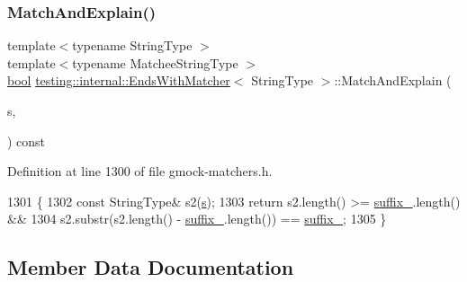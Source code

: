 \subsubsection{\texorpdfstring{Match\+And\+Explain()}{MatchAndExplain()}\hspace{0.1cm}{\footnotesize\ttfamily [2/2]}}
{\footnotesize\ttfamily template$<$typename String\+Type $>$ \\
template$<$typename Matchee\+String\+Type $>$ \\
\hyperlink{classbool}{bool} \hyperlink{classtesting_1_1internal_1_1EndsWithMatcher}{testing\+::internal\+::\+Ends\+With\+Matcher}$<$ String\+Type $>$\+::Match\+And\+Explain (\begin{DoxyParamCaption}\item[{const Matchee\+String\+Type \&}]{s,  }\item[{\hyperlink{classtesting_1_1MatchResultListener}{Match\+Result\+Listener} $\ast$}]{ }\end{DoxyParamCaption}) const\hspace{0.3cm}{\ttfamily [inline]}}



Definition at line 1300 of file gmock-\/matchers.\+h.


\begin{DoxyCode}
1301                                                      \{
1302     \textcolor{keyword}{const} StringType& s2(\hyperlink{namespaceservice__node__3_aa976421a49e0b54f23833423400849ae}{s});
1303     \textcolor{keywordflow}{return} s2.length() >= \hyperlink{classtesting_1_1internal_1_1EndsWithMatcher_a66f75082cf1041cd328c01b47acf8350}{suffix\_}.length() &&
1304         s2.substr(s2.length() - \hyperlink{classtesting_1_1internal_1_1EndsWithMatcher_a66f75082cf1041cd328c01b47acf8350}{suffix\_}.length()) == \hyperlink{classtesting_1_1internal_1_1EndsWithMatcher_a66f75082cf1041cd328c01b47acf8350}{suffix\_};
1305   \}
\end{DoxyCode}


\subsection{Member Data Documentation}
\mbox{\label{classtesting_1_1internal_1_1EndsWithMatcher_a66f75082cf1041cd328c01b47acf8350}} 
